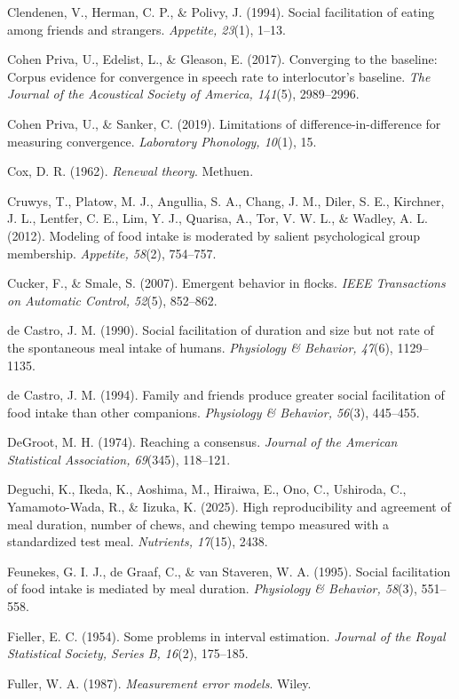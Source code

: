 \documentclass[12pt]{article}
\begin{document}
Clendenen, V., Herman, C. P., \& Polivy, J. (1994). Social facilitation of eating among friends and strangers. \emph{Appetite, 23}(1), 1--13.

Cohen Priva, U., Edelist, L., \& Gleason, E. (2017). Converging to the baseline: Corpus evidence for convergence in speech rate to interlocutor's baseline. \emph{The Journal of the Acoustical Society of America, 141}(5), 2989--2996.

Cohen Priva, U., \& Sanker, C. (2019). Limitations of difference-in-difference for measuring convergence. \emph{Laboratory Phonology, 10}(1), 15.

Cox, D. R. (1962). \emph{Renewal theory}. Methuen.

Cruwys, T., Platow, M. J., Angullia, S. A., Chang, J. M., Diler, S. E., Kirchner, J. L., Lentfer, C. E., Lim, Y. J., Quarisa, A., Tor, V. W. L., \& Wadley, A. L. (2012). Modeling of food intake is moderated by salient psychological group membership. \emph{Appetite, 58}(2), 754--757.

Cucker, F., \& Smale, S. (2007). Emergent behavior in flocks. \emph{IEEE Transactions on Automatic Control, 52}(5), 852--862.

de Castro, J. M. (1990). Social facilitation of duration and size but not rate of the spontaneous meal intake of humans. \emph{Physiology \& Behavior, 47}(6), 1129--1135.

de Castro, J. M. (1994). Family and friends produce greater social facilitation of food intake than other companions. \emph{Physiology \& Behavior, 56}(3), 445--455.

DeGroot, M. H. (1974). Reaching a consensus. \emph{Journal of the American Statistical Association, 69}(345), 118--121.

Deguchi, K., Ikeda, K., Aoshima, M., Hiraiwa, E., Ono, C., Ushiroda, C., Yamamoto-Wada, R., \& Iizuka, K. (2025). High reproducibility and agreement of meal duration, number of chews, and chewing tempo measured with a standardized test meal. \emph{Nutrients, 17}(15), 2438.

Feunekes, G. I. J., de Graaf, C., \& van Staveren, W. A. (1995). Social facilitation of food intake is mediated by meal duration. \emph{Physiology \& Behavior, 58}(3), 551--558.

Fieller, E. C. (1954). Some problems in interval estimation. \emph{Journal of the Royal Statistical Society, Series B, 16}(2), 175--185.

Fuller, W. A. (1987). \emph{Measurement error models}. Wiley.
\end{document}
